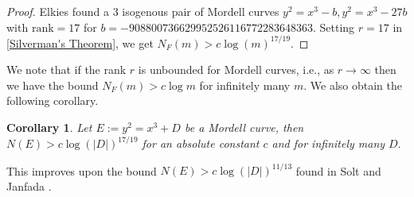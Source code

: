 \documentclass[12pt]{amsart}
\theoremstyle{plain}
\newtheorem{cor}[thm]{Corollary}
\theoremstyle{definition}
\theoremstyle{remark}
\numberwithin{equation}{section}
\numberwithin{thm}{section}
\theoremstyle{named}
\theoremstyle{named}
\begin{document}
\begin{proof}

{Elkies}\cite{442487} found a $3$ isogenous pair of Mordell curves $y^2 = x^3 - b, y^2 = x^3 - 27b$ with $\mathrm{rank} = 17$ for $b = -908800736629952526116772283648363.$ Setting $r = 17$ in \ref{Silverman's Theorem}, we get $N_{F}(m) > c \log{(m)}^{17/19}.$
\end{proof}
We note that if the rank $r$ is unbounded for Mordell curves, i.e., as $r \to \infty$ then we have the bound $N_{F}(m) > c \log{m}$ for infinitely many $m.$ We also obtain the following corollary. 

\begin{cor}
    Let $E:= y^2 = x^3 + D$ be a Mordell curve, then $N(E) > c \log{(|D|)}^{17/19}$ for an absolute constant $c$ and for infinitely many $D.$
\end{cor}
This improves upon the bound $N(E) > c \log{(|D|)}^{11/13}$ found in {Solt and Janfada} \cite{lower}.
\end{document}
